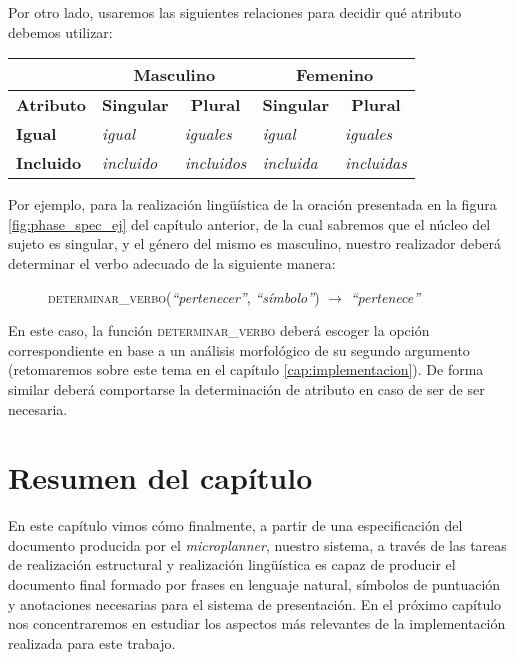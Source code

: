 \noindent
Por otro lado, usaremos las siguientes relaciones para decidir qué atributo debemos utilizar:

\begin{table}[H]
\centering
\begin{tabular}{l|l|l|l|l|}
\cline{2-5}
                                 & \multicolumn{2}{c|}{\textbf{Masculino}}                                       & \multicolumn{2}{c|}{\textbf{Femenino}}                                        \\ \hline
\multicolumn{1}{|c|}{\textbf{Atributo}} & \multicolumn{1}{c|}{\textbf{Singular}} & \multicolumn{1}{c|}{\textbf{Plural}} & \multicolumn{1}{c|}{\textbf{Singular}} & \multicolumn{1}{c|}{\textbf{Plural}} \\ \hline
\multicolumn{1}{|l|}{\textbf{Igual}}    & \textit{igual}                                  & \textit{iguales}                              & \textit{igual}                                  & \textit{iguales}                              \\ \hline
\multicolumn{1}{|l|}{\textbf{Incluido}} & \textit{incluido}                               & \textit{incluidos}                            & \textit{incluida}                               & \textit{incluidas}                            \\ \hline
\end{tabular}
\end{table}

Por ejemplo, para la realización lingüística de la oración presentada en la figura \ref{fig:phase_spec_ej} del capítulo anterior, de la cual sabremos que el núcleo del sujeto es singular, y el género del mismo es masculino, nuestro realizador deberá determinar el verbo adecuado de la siguiente manera:

\begin{figure}[H]
\centering
\textsc{determinar\_verbo}(\emph{``pertenecer''}, \emph{``símbolo''}) $\rightarrow$ \emph{``pertenece''}
\end{figure}

\noindent
En este caso, la función \textsc{determinar\_verbo} deberá escoger la opción correspondiente en base a un análisis morfológico de su segundo argumento (retomaremos sobre este tema en el capítulo \ref{cap:implementacion}). De forma similar deberá comportarse la determinación de atributo en caso de ser de ser necesaria. 

\section{Resumen del capítulo}
En este capítulo vimos cómo finalmente, a partir de una especificación del documento producida por el \textit{microplanner}, nuestro sistema, a través de las tareas de realización estructural y realización lingüística es capaz de producir el documento final formado por frases en lenguaje natural, símbolos de puntuación y anotaciones necesarias para el sistema de presentación. En el próximo capítulo nos concentraremos en estudiar los aspectos más relevantes de la implementación realizada para este trabajo.